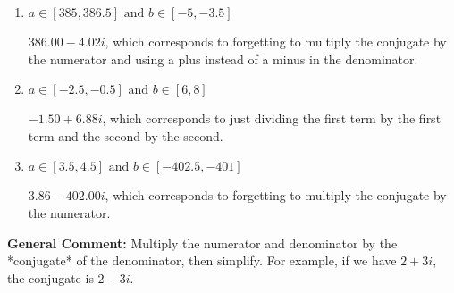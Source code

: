 \documentclass{extbook}[14pt]
\begin{document}
\begin{enumerate}
{\begin{enumerate}[label=\Alph*.]
 $-4.94  - 2.58 i$, which corresponds to forgetting to multiply the conjugate by the numerator and not computing the conjugate correctly.
\item \( a \in [385, 386.5] \text{ and } b \in [-5, -3.5] \)

 $386.00  - 4.02 i$, which corresponds to forgetting to multiply the conjugate by the numerator and using a plus instead of a minus in the denominator.
\item \( a \in [-2.5, -0.5] \text{ and } b \in [6, 8] \)

 $-1.50  + 6.88 i$, which corresponds to just dividing the first term by the first term and the second by the second.
\item \( a \in [3.5, 4.5] \text{ and } b \in [-402.5, -401] \)

 $3.86  - 402.00 i$, which corresponds to forgetting to multiply the conjugate by the numerator.
\end{enumerate}

\textbf{General Comment:} Multiply the numerator and denominator by the *conjugate* of the denominator, then simplify. For example, if we have $2+3i$, the conjugate is $2-3i$.
}
\end{enumerate}
\end{document}
